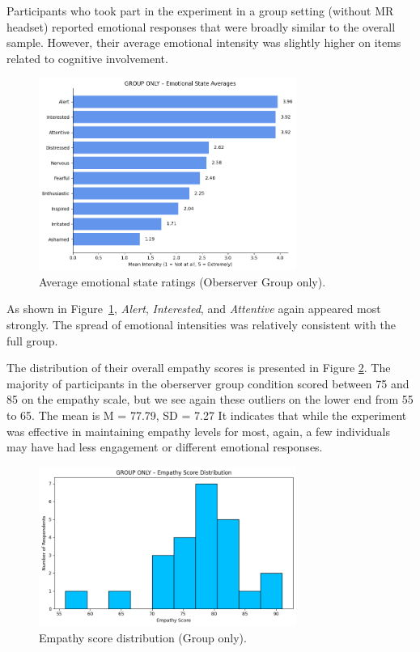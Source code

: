 Participants who took part in the experiment in a group setting (without MR headset) reported emotional responses that were broadly similar to the overall sample. However, their average emotional intensity was slightly higher on items related to cognitive involvement.

\begin{figure}[htbp]
    \centering
    \includegraphics[width=0.75\textwidth]{../../Figures/emotional-post-grp.png}
    \caption{Average emotional state ratings (Oberserver Group only).}
    \label{fig:emotional_post_group}
\end{figure}

As shown in Figure~\ref{fig:emotional_post_group}, \textit{Alert}, \textit{Interested}, and \textit{Attentive} again appeared most strongly. The spread of emotional intensities was relatively consistent with the full group.

\vspace{1em}

The distribution of their overall empathy scores is presented in Figure \ref{fig:empathy_group_post}. The majority of participants in the oberserver group condition scored between 75 and 85 on the empathy scale, but we see again these outliers on the lower end from 55 to 65. The mean is M = 77.79, SD = 7.27 It indicates that while the experiment was effective in maintaining empathy levels for most, again, a few individuals may have had less engagement or different emotional responses. 


\begin{figure}[htbp]
    \centering
    \includegraphics[width=0.75\textwidth]{../../Figures/empathy-score-post-grp.png}
    \caption{Empathy score distribution (Group only).}
    \label{fig:empathy_group_post}
\end{figure}

